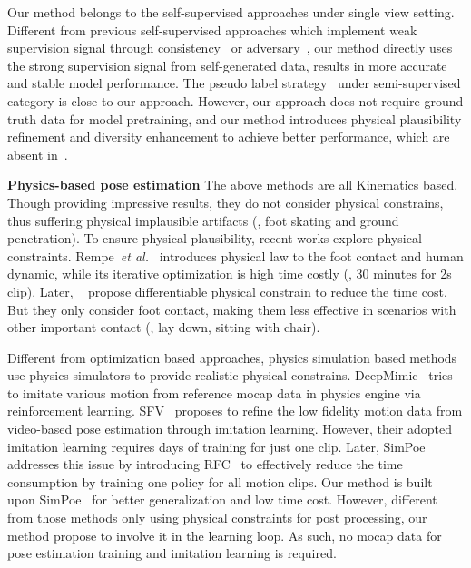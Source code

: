 \documentclass[10pt,twocolumn,letterpaper]{article}
\newcommand{\et}{\emph{et al.}}
\begin{document}
Our method belongs to the self-supervised approaches {under single view setting}.
Different from previous self-supervised approaches which implement weak supervision signal through consistency~\cite{chen2019unsupervised} or adversary~\cite{drover2018can, yu2021towards}, our method directly uses the strong supervision signal from self-generated data, results in more accurate and stable model performance.
The pseudo label strategy~\cite{li2019boosting} under semi-supervised category is close to our approach. However, our approach does not require ground truth data for model pretraining, and our method introduces physical plausibility refinement and diversity enhancement to achieve better performance, which are absent in~\cite{li2019boosting}. 


\noindent \textbf {Physics-based pose estimation}
The above methods   are all Kinematics based. Though providing impressive results, they do not consider  physical constrains, thus suffering physical implausible artifacts (\eg,  foot skating and ground penetration).
To ensure physical plausibility, recent works explore physical constraints.
Rempe~\et~\cite{rempe2020contact} introduces physical law to the foot contact and human dynamic,
while its iterative optimization is high time costly (\eg, 30 minutes for 2s clip).
Later, ~\cite{shimada2020physcap, shimada2021neural, xie2021physics} propose differentiable physical constrain to reduce the time cost.
But they only consider foot contact, making them less effective in scenarios with  other important contact (\eg, lay down, sitting with chair). 

Different from optimization based approaches, physics simulation based methods use physics simulators to provide realistic physical constrains.
DeepMimic~\cite{peng2018deepmimic} tries to imitate various motion from reference mocap data in physics engine via reinforcement learning.
SFV~\cite{peng2018sfv}   proposes to refine  the low fidelity motion data from video-based pose estimation  through imitation learning.
However,  their adopted  imitation learning requires days of training for just one clip.
Later, SimPoe~\cite{yuan2021simpoe} addresses this issue by introducing RFC~\cite{yuan2020residual} to effectively reduce the time consumption by training one policy for all motion clips.
Our method is built upon SimPoe~\cite{yuan2021simpoe} for better generalization and low time cost. However, different from those methods only using physical constraints   for post processing, our method propose to involve it in the learning loop. As such,  no mocap data for pose estimation training and imitation learning is required.
\end{document}
